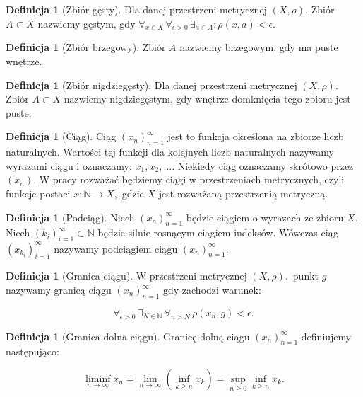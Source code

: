 \documentclass[licencjacka]{pwr_wmat_praca_dyplomowa}
\theoremstyle{plain}
\numberwithin{theorem}{chapter}
\theoremstyle{definition}
\numberwithin{theorem}{chapter}
\newtheorem{definition}[theorem]{Definicja}
\begin{document}
\begin{definition}[Zbiór gęsty]
Dla danej przestrzeni metrycznej $(X, \rho)$. Zbiór $A \subset X$ nazwiemy gęstym, gdy $\forall_{x \in X} \, \forall_{\epsilon>0} \, \exists_{a \in A} : \rho(x, a) < \epsilon$.
\end{definition}

\begin{definition}[Zbiór brzegowy]
Zbiór $A$ nazwiemy brzegowym, gdy ma puste wnętrze.
\end{definition}

\begin{definition}[Zbiór nigdziegęsty]
Dla danej przestrzeni metrycznej $(X, \rho)$. Zbiór $A \subset X$ nazwiemy nigdziegęstym, gdy wnętrze domknięcia tego zbioru jest puste.
\end{definition}


\begin{definition}[Ciąg]
Ciąg $(x_n)_{n=1}^{\infty}$ jest to funkcja określona na zbiorze liczb naturalnych. Wartości tej funkcji dla kolejnych liczb naturalnych nazywamy wyrazami ciągu i oznaczamy: $x_1, x_2, \ldots$. Niekiedy ciąg oznaczamy skrótowo przez $(x_n)$. W pracy rozważać będziemy ciągi w przestrzeniach metrycznych, czyli funkcje postaci $x: \mathbb{N} \rightarrow X,$ gdzie $X$ jest rozważaną przestrzenią metryczną.
\end{definition}


\begin{definition}[Podciąg]
Niech $(x_n)_{n=1}^{\infty}$ będzie ciągiem o wyrazach ze zbioru $X$. Niech $(k_i)_{i=1}^{\infty} \subset \mathbb{N}$ będzie silnie rosnącym ciągiem indeksów. Wówczas ciąg $(x_{k_i})_{i=1}^{\infty}$ nazywamy podciągiem ciągu $(x_n)_{n=1}^{\infty}.$
\end{definition}

\begin{definition}[Granica ciągu]
W przestrzeni metrycznej $(X, \rho),$ punkt $g$ nazywamy granicą ciągu $(x_n)_{n=1}^\infty$ gdy zachodzi warunek:

$$\forall_{\epsilon>0} \, \exists_{N \in \mathbb{N}} \, \forall_{n>N} \, \rho(x_n, g) < \epsilon.$$
\end{definition}


\begin{definition}[Granica dolna ciągu]
Granicę dolną ciągu $(x_n)_{n=1}^\infty$ definiujemy następująco:

$$\liminf_{n \rightarrow \infty} x_n = \lim_{n \rightarrow \infty} \left(\inf_{k \geq n} x_k\right) = \sup_{n \geq 0} \inf_{k \geq n} x_k.$$
\end{definition}
\end{document}
